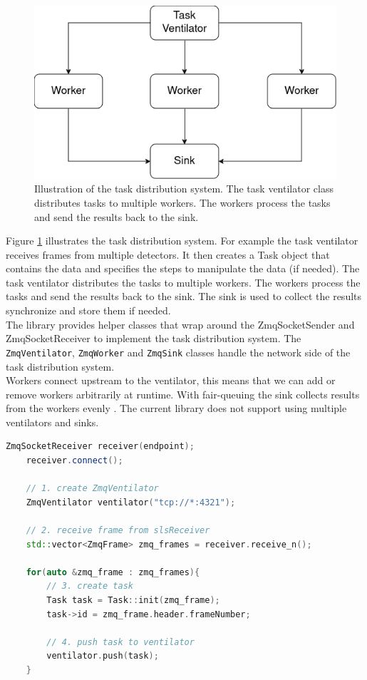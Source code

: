 \documentclass[./chapitre3.tex]{subfiles}
\begin{document}
\begin{figure}
    \centering
    \includegraphics[width=\textwidth]{Chapitre3/figures/task_distribution.png}
    \caption{Illustration of the task distribution system. The task ventilator class distributes
        tasks to multiple workers. The workers process the tasks and send the results back to the
        sink.}
    \label{fig:task_distribution}
\end{figure}

Figure \ref{fig:task_distribution} illustrates the task distribution system. For example the task
ventilator receives frames from multiple detectors. It then creates a Task object that contains
the data and specifies the steps to manipulate the data (if needed). The task ventilator
distributes the tasks to multiple workers. The workers process the tasks and send the results
back to the sink. The sink is used to collect the results synchronize and store them if needed.\\

The library provides helper classes that wrap around the ZmqSocketSender and ZmqSocketReceiver
to implement the task distribution system. The \lstinline|ZmqVentilator|, \lstinline|ZmqWorker|
and \lstinline|ZmqSink| classes handle the network side of the task distribution system.\\

Workers connect upstream to the ventilator, this means that we can add or
remove workers arbitrarily at runtime. With fair-queuing the sink collects
results from the workers evenly \cite{hintjens2013zeromq}. The current library
does not support using multiple ventilators and sinks.\\

\begin{lstlisting}[language=C++, caption=Example of a task ventilator, label=lst:task_ventilator]
    ZmqSocketReceiver receiver(endpoint);
    receiver.connect();

    // 1. create ZmqVentilator
    ZmqVentilator ventilator("tcp://*:4321");

    // 2. receive frame from slsReceiver
    std::vector<ZmqFrame> zmq_frames = receiver.receive_n();

    for(auto &zmq_frame : zmq_frames){
        // 3. create task
        Task task = Task::init(zmq_frame);
        task->id = zmq_frame.header.frameNumber;

        // 4. push task to ventilator
        ventilator.push(task);
    }
\end{lstlisting}
\end{document}
